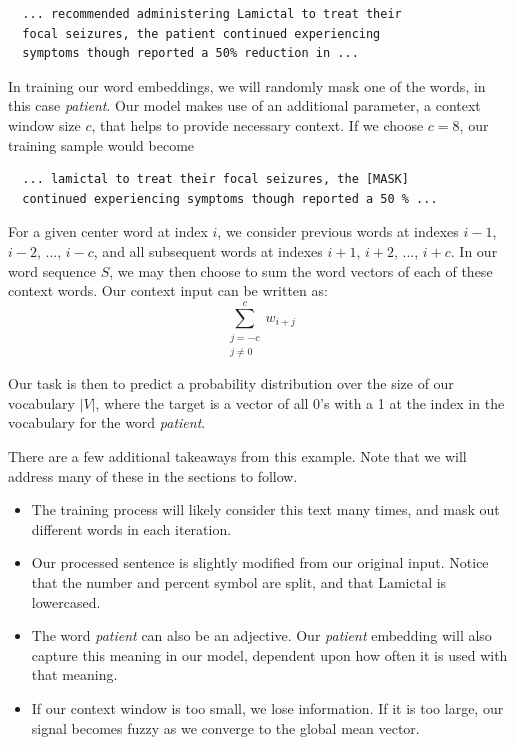 \begin{verbatim}
  ... recommended administering Lamictal to treat their
  focal seizures, the patient continued experiencing
  symptoms though reported a 50% reduction in ...
  \end{verbatim}

In training our word embeddings, we will randomly mask one of the words, in this case \textit{patient}.
Our model makes use of an additional parameter, a context window size $c$, that helps to provide necessary context.
If we choose $c = 8$, our training sample would become

\begin{verbatim}
  ... lamictal to treat their focal seizures, the [MASK]
  continued experiencing symptoms though reported a 50 % ...
  \end{verbatim}

For a given center word at index $i$, we consider previous words at indexes $i-1$, $i-2$, ..., $i-c$, and all subsequent words at indexes $i+1$, $i+2$, ..., $i+c$.
In our word sequence $S$, we may then choose to sum the word vectors of each of these context words.
Our context input can be written as:
\begin{equation}
  \sum_{ \substack {j=-c \\ j \neq 0}}^c w_{i+j}
\end{equation}

Our task is then to predict a probability distribution over the size of our vocabulary $|V|$, where the target is a vector of all 0's with a 1 at the index in the vocabulary for the word \textit{patient}.

There are a few additional takeaways from this example.
Note that we will address many of these in the sections to follow.
\begin{itemize}
  \item The training process will likely consider this text many times, and mask out different words in each iteration.
  \item Our processed sentence is slightly modified from our original input.
  Notice that the number and percent symbol are split, and that Lamictal is lowercased.
  \item The word \textit{patient} can also be an adjective.
  Our \textit{patient} embedding will also capture this meaning in our model, dependent upon how often it is used with that meaning.
  \item If our context window is too small, we lose information.
  If it is too large, our signal becomes fuzzy as we converge to the global mean vector.
\end{itemize}

